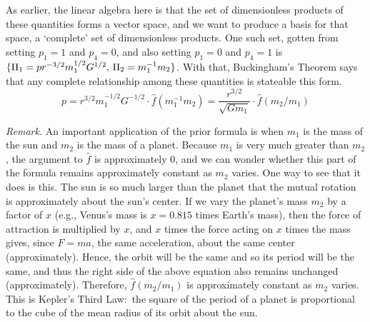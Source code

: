 As earlier, 
the linear algebra here is that
the set of dimensionless products of these quantities forms a vector space,
and we want to produce a basis for that space, 
a `complete' set of dimensionless products.
One such set, gotten from setting $p_1=1$ and $p_4=0$, 
and also setting $p_1=0$ and $p_4=1$ is
$\mbox{$\{\Pi_1=pr^{-3/2}m_1^{1/2}G^{1/2},\,\Pi_2=m_1^{-1}m_2\}$}$.
With that, Buckingham's Theorem says that
any complete relationship among these quantities is stateable this form.
\begin{equation*}
  p = r^{3/2}m_1^{-1/2}G^{-1/2}\cdot\hat{f}(m_1^{-1}m_2)  
    = \frac{r^{3/2}}{\sqrt{Gm_1}}\cdot\hat{f}(m_2/m_1)
\end{equation*}

\textit{Remark.}
An important application of the prior formula is
when $m_1$ is the mass of the sun and $m_2$ is the mass  
of a planet.
Because $m_1$ is very much greater than $m_2$, 
the argument to $\hat{f}$ is approximately $0$, 
and we can wonder whether
this part of the formula remains approximately constant as $m_2$ varies.
One way to see that it does is this.
The sun is so much larger than the planet
that the mutual rotation is approximately about the sun's center.
If we vary the planet's mass $m_2$ by a factor of $x$ 
(e.g., Venus's mass is
$x=0.815$ times Earth's mass),
then the force of attraction is multiplied by $x$,
and $x$ times the force acting on $x$ times the mass gives, since $F=ma$, 
the same acceleration, about the same center (approximately).
Hence,
the orbit will be the same and so its period will be the same, 
and thus the right side of the above equation also remains unchanged 
(approximately).
Therefore,
$\hat{f}(m_2/m_1)$ is approximately constant as $m_2$ varies.
This is Kepler's Third Law:~the square of the
period of a planet is proportional to the cube of the mean radius of its orbit
about the sun.

